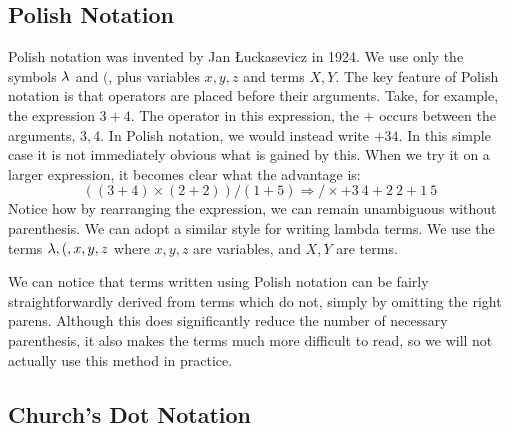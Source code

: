 \subsection{Polish Notation}



Polish notation was invented by Jan \L uckasevicz in 1924. We use only the symbols $\lambda$ and $($, plus variables $x,y,z$ and terms $X,Y$. The key feature of Polish notation is that operators are placed before their arguments. Take, for example, the expression $3 + 4$. The operator in this expression, the $+$ occurs between the arguments, $3,4$. In Polish notation, we would instead write $+ 3 4$. In this simple case it is not immediately obvious what is gained by this. When we try it on a larger expression, it becomes clear what the advantage is:
\begin{equation*}
  ((3 + 4) \times (2 + 2)) / (1 + 5) \Rightarrow / \times + 3\ 4 + 2\ 2 + 1\ 5
\end{equation*}
Notice how by rearranging the expression, we can remain unambiguous without parenthesis. We can adopt a similar style for writing lambda terms. We use the terms $\lambda,(, x, y, z$ where $x, y, z$ are variables, and $X,Y$ are terms.\\


We can notice that terms written using Polish notation can be fairly straightforwardly derived from terms which do not, simply by omitting the right parens. Although this does significantly reduce the number of necessary parenthesis, it also makes the terms much more difficult to read, so we will not actually use this method in practice.

\subsection{Church's Dot Notation}

